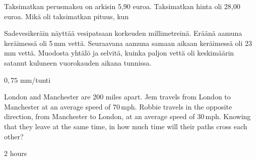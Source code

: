 \begin{tehtavasivu}
\begin{tehtava}
 Taksimatkan perusmaksu on arkisin 5,90 euroa. Taksimatkan hinta oli 28,00 euroa. Mikä oli taksimatkan pituus, kun
\begin{alakohdat}
\end{alakohdat}
	\begin{vastaus}
		\begin{alakohdat}
		\end{alakohdat}
	\end{vastaus}
\end{tehtava}


\begin{tehtava}
Sadevesikeräin näyttää vesipatsaan korkeuden millimetreinä. Eräänä aamuna keräimessä oli 5\,mm vettä. Seuraavana aamuna samaan aikaan keräimessä oli 23\,mm vettä. Muodosta yhtälö ja selvitä, kuinka paljon vettä oli keskimäärin satanut kuluneen vuorokauden aikana tunnissa.
	\begin{vastaus}
	$0,75$ mm/tunti
	\end{vastaus}
\end{tehtava}


\begin{tehtava}
London and Manchester are 200 miles apart. Jem travels from London to Manchester at an average speed of 70\,mph. Robbie travels in the opposite direction, from Manchester to London, at an average speed of 30\,mph. Knowing that they leave at the same time, in how much time will their paths cross each other?
	\begin{vastaus}
		2 hours
	\end{vastaus}
\end{tehtava}


\end{tehtavasivu}
